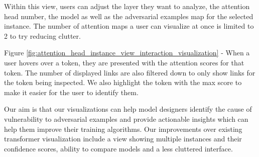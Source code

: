 \documentclass[journal]{vgtc}                %
\begin{document}
Within this view, users can adjust the layer they want to analyze, the attention head number, the model as well as the adversarial examples map for the selected instance. The number of attention maps a user can visualize at once is limited to 2 to try reducing clutter. 

Figure \ref{fig:attention_head_instance_view_interaction_visualization} - When a user hovers over a token, they are presented with the attention scores for that token. The number of displayed links are also filtered down to only show links for the token being inspected. We also highlight the token with the max score to make it easier for the user to identify them.
 



Our aim is that our visualizations can help model designers identify the cause of vulnerability to adversarial examples and provide actionable insights which can help them improve their training algorithms. Our improvements over existing transformer visualization include a view showing multiple instances and their confidence scores, ability to compare models and a less cluttered interface. 

\end{document}
